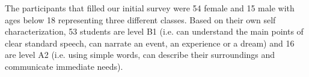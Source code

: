 The participants that filled our initial survey were 54 female and 15 male with ages below 18 representing three different classes. Based on their own self characterization, 53 students are level B1 (i.e. can understand the main points of clear standard speech, can narrate an event, an experience or a dream) and 16 are level A2 (i.e. using simple words, can describe their surroundings and communicate immediate needs). 















